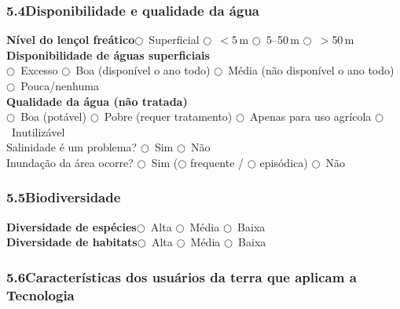\subsubsection*{5.4\quad Disponibilidade e qualidade da água}

\noindent\textbf{Nível do lençol freático}\quad $\bigcirc$~Superficial \quad $\bigcirc$~$<$5\,m \quad $\bigcirc$~5--50\,m \quad $\bigcirc$~$>$50\,m\\[4pt]
\textbf{Disponibilidade de águas superficiais}\\
$\bigcirc$~Excesso \quad $\bigcirc$~Boa (disponível o ano todo) \quad $\bigcirc$~Média (não disponível o ano todo) \quad $\bigcirc$~Pouca/nenhuma\\[4pt]
\textbf{Qualidade da água (não tratada)}\\
$\bigcirc$~Boa (potável) \quad $\bigcirc$~Pobre (requer tratamento) \quad $\bigcirc$~Apenas para uso agrícola \quad $\bigcirc$~Inutilizável\\[4pt]
Salinidade é um problema? $\bigcirc$~Sim \quad $\bigcirc$~Não\\
Inundação da área ocorre? $\bigcirc$~Sim ($\bigcirc$ frequente / $\bigcirc$ episódica) \quad $\bigcirc$~Não

\subsubsection*{5.5\quad Biodiversidade}

\textbf{Diversidade de espécies}\quad $\bigcirc$~Alta \quad $\bigcirc$~Média \quad $\bigcirc$~Baixa\\
\textbf{Diversidade de habitats}\quad $\bigcirc$~Alta \quad $\bigcirc$~Média \quad $\bigcirc$~Baixa

\subsubsection*{5.6\quad Características dos usuários da terra que aplicam a Tecnologia}

